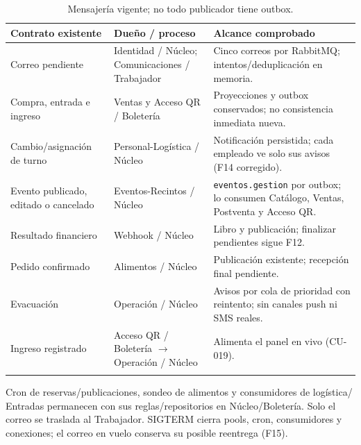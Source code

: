 \begin{center}\begin{longtable}{p{4cm}p{4cm}p{6cm}}
\toprule Contrato existente & Dueño / proceso & Alcance comprobado\\\midrule\endhead
Correo pendiente & Identidad / Núcleo; Comunicaciones / Trabajador & Cinco correos por RabbitMQ;
intentos/deduplicación en memoria.\\
Compra, entrada e ingreso & Ventas y Acceso QR / Boletería & Proyecciones y outbox conservados;
no consistencia inmediata nueva.\\
Cambio/asignación de turno & Personal-Logística / Núcleo & Notificación persistida; cada empleado ve
solo sus avisos (F14 corregido).\\
Evento publicado, editado o cancelado & Eventos-Recintos / Núcleo & \texttt{eventos.gestion} por outbox;
lo consumen Catálogo, Ventas, Postventa y Acceso QR.\\
Resultado financiero & Webhook / Núcleo & Libro y publicación; finalizar pendientes sigue F12.\\
Pedido confirmado & Alimentos / Núcleo & Publicación existente; recepción final pendiente.\\
Evacuación & Operación / Núcleo & Avisos por cola de prioridad con reintento; sin canales push
ni SMS reales.\\
Ingreso registrado & Acceso QR / Boletería $\rightarrow$ Operación / Núcleo & Alimenta el panel en vivo
(CU-019).\\
\bottomrule\caption{Mensajería vigente; no todo publicador tiene outbox.}\label{tab:eventos}
\end{longtable}\end{center}
Cron de reservas/publicaciones, sondeo de alimentos y consumidores de logística/
Entradas permanecen con sus reglas/repositorios en Núcleo/Boletería. Solo el correo
se traslada al Trabajador. SIGTERM cierra pools, cron, consumidores y conexiones;
el correo en vuelo conserva su posible reentrega (F15).

